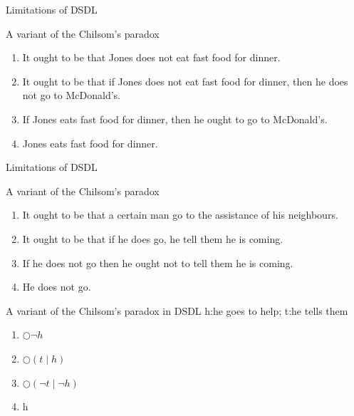 \documentclass{beamer}
\begin{document}
\begin{frame}{Limitations of DSDL}
\begin{block}{A variant of the Chilsom's paradox}
\begin{enumerate}
\item[A]It ought to be that Jones does not eat fast food for dinner.
\item[B]It ought to be that if Jones does not eat fast food for dinner, then he does not go to McDonald’s.
\item[C] If Jones eats fast food for dinner, then he ought to go to McDonald’s.
\item[D]Jones eats fast food for dinner.
\end{enumerate}
\end{block}
\end{frame}
\begin{frame}{Limitations of DSDL}
\begin{block}{A variant of the Chilsom's paradox}
\begin{enumerate}
\item[A]It ought to be that a certain man go to the assistance of his neighbours.

\item[B] It ought to be that if he does go, he tell them he is coming.

\item[C]  If he does not go then he ought not to tell them he is coming.

\item[D] He does not go.
\end{enumerate}
\end{block}
\begin{block}{A variant of the Chilsom's paradox in DSDL}
h:he goes to help; t:he tells them
\begin{enumerate}
\item[A]$\bigcirc \neg h$
\item[B]$\bigcirc( t \mid  h)$
\item[C]$\bigcirc(\neg t\mid \neg h)$
\item[D]h
\end{enumerate}
\end{block}
\end{frame}
\end{document}
